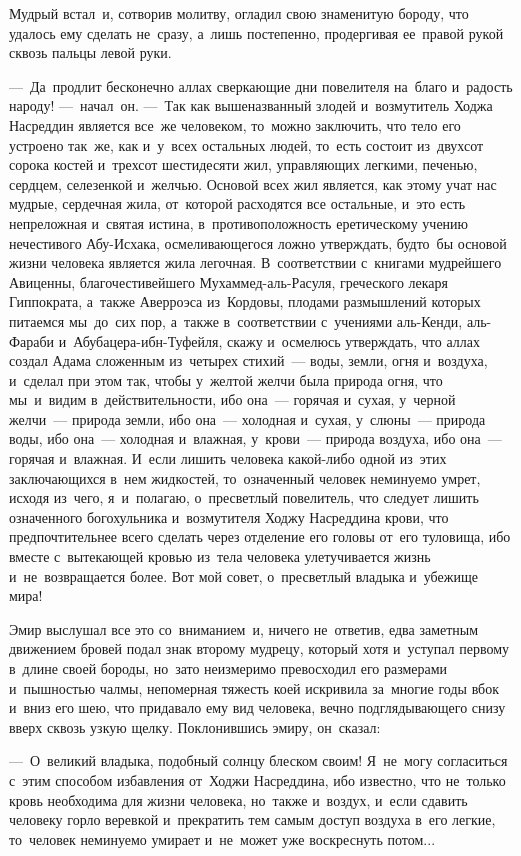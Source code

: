 \documentclass[12pt,a4paper]{book}
\begin{document}
Мудрый встал~и, сотворив молитву, огладил свою знаменитую бороду, что удалось ему сделать не~сразу, а~лишь постепенно, продергивая ее~правой рукой сквозь пальцы левой руки.

—~Да~продлит бесконечно аллах сверкающие дни повелителя на~благо и~радость народу! —~начал~он. —~Так как вышеназванный злодей и~возмутитель Ходжа Насреддин является все~же человеком, то~можно заключить, что тело его устроено так~же, как и~у~всех остальных людей, то~есть состоит из~двухсот сорока костей и~трехсот шестидесяти жил, управляющих легкими, печенью, сердцем, селезенкой и~желчью. Основой всех жил является, как этому учат нас мудрые, сердечная жила, от~которой расходятся все остальные, и~это есть непреложная и~святая истина, в~противоположность еретическому учению нечестивого Абу-Исхака, осмеливающегося ложно утверждать, будто~бы основой жизни человека является жила легочная. В~соответствии с~книгами мудрейшего Авиценны, благочестивейшего Мухаммед-аль-Расуля, греческого лекаря Гиппократа, а~также Аверроэса из~Кордовы, плодами размышлений которых питаемся мы~до~сих пор, а~также в~соответствии с~учениями аль-Кенди, аль-Фараби и~Абубацера-ибн-Туфейля, скажу и~осмелюсь утверждать, что аллах создал Адама сложенным из~четырех стихий~— воды, земли, огня и~воздуха, и~сделал при этом так, чтобы у~желтой желчи была природа огня, что мы~и~видим в~действительности, ибо она~— горячая и~сухая, у~черной желчи~— природа земли, ибо она~— холодная и~сухая, у~слюны~— природа воды, ибо она~— холодная и~влажная, у~крови~— природа воздуха, ибо она~— горячая и~влажная. И~если лишить человека какой-либо одной из~этих заключающихся в~нем жидкостей, то~означенный человек неминуемо умрет, исходя из~чего, я~и~полагаю, о~пресветлый повелитель, что следует лишить означенного богохульника и~возмутителя Ходжу Насреддина крови, что предпочтительнее всего сделать через отделение его головы от~его туловища, ибо вместе с~вытекающей кровью из~тела человека улетучивается жизнь и~не~возвращается более. Вот мой совет, о~пресветлый владыка и~убежище мира!

Эмир выслушал все это со~вниманием~и, ничего не~ответив, едва заметным движением бровей подал знак второму мудрецу, который хотя и~уступал первому в~длине своей бороды, но~зато неизмеримо превосходил его размерами и~пышностью чалмы, непомерная тяжесть коей искривила за~многие годы вбок и~вниз его шею, что придавало ему вид человека, вечно подглядывающего снизу вверх сквозь узкую щелку. Поклонившись эмиру, он~сказал:

—~О~великий владыка, подобный солнцу блеском своим! Я~не~могу согласиться с~этим способом избавления от~Ходжи Насреддина, ибо известно, что не~только кровь необходима для жизни человека, но~также и~воздух, и~если сдавить человеку горло веревкой и~прекратить тем самым доступ воздуха в~его легкие, то~человек неминуемо умирает и~не~может уже воскреснуть потом...
\end{document}
